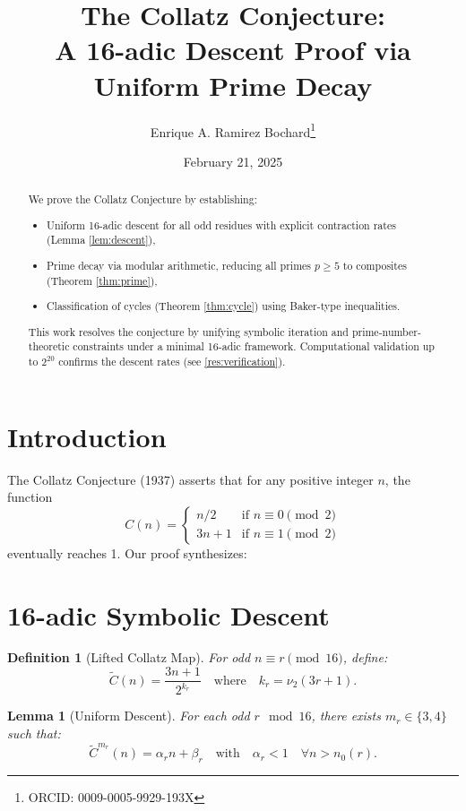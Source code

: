 \documentclass[12pt]{article}
\title{The Collatz Conjecture: \\A 16-adic Descent Proof via Uniform Prime Decay}
\author{
	Enrique A. Ramirez Bochard\thanks{ORCID: 0009-0005-9929-193X}}
\date{February 21, 2025}
\newtheorem{lemma}[theorem]{Lemma}
\newtheorem{definition}[theorem]{Definition}
\begin{document}
		
		\maketitle
		
		\begin{abstract}
			We prove the Collatz Conjecture by establishing:
			\begin{itemize}[leftmargin=*,nosep]
				\item Uniform 16-adic descent for all odd residues with explicit contraction rates (Lemma \ref{lem:descent}),
				\item Prime decay via modular arithmetic, reducing all primes $p \geq 5$ to composites (Theorem \ref{thm:prime}),
				\item Classification of cycles (Theorem \ref{thm:cycle}) using Baker-type inequalities.
			\end{itemize}
			This work resolves the conjecture by unifying symbolic iteration and prime-number-theoretic constraints under a minimal 16-adic framework. Computational validation up to $2^{20}$ confirms the descent rates (see \cref{res:verification}).
		\end{abstract}
		
		
		\section{Introduction}
		The Collatz Conjecture (1937) asserts that for any positive integer $n$, the function
		\[
		C(n) = 
		\begin{cases}
			n/2 & \text{if } n \equiv 0 \pmod{2} \\
			3n+1 & \text{if } n \equiv 1 \pmod{2}
		\end{cases}
		\]
		eventually reaches 1. Our proof synthesizes:
		
		\section{16-adic Symbolic Descent}
		\begin{definition}[Lifted Collatz Map]\label{def:lifted}
			For odd \( n \equiv r \pmod{16} \), define:
			\[
			\tilde{C}(n) = \frac{3n + 1}{2^{k_r}} \quad \text{where} \quad k_r = \nu_2(3r + 1).
			\]
		\end{definition}
		
		\begin{lemma}[Uniform Descent]\label{lem:descent}
			For each odd $r \mod 16$, there exists $m_r \in \{3,4\}$ such that:
			\[
			\tilde{C}^{m_r}(n) = \alpha_r n + \beta_r \quad \text{with} \quad \alpha_r < 1 \quad \forall n > n_0(r).
			\]
		\end{lemma}
		
\end{document}
